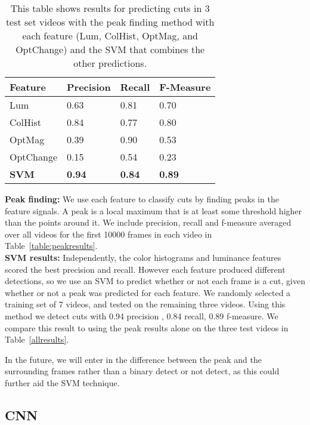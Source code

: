 \begin{table}[h!]
  \begin{center}
  	\small{
	\begin{tabular}{l|lll}
	Feature   & Precision  & Recall     & F-Measure  \\ \hline
	Lum       & 0.63      & 0.81   & 0.70      \\
	ColHist   & 0.84      & 0.77   & 0.80      \\
	OptMag    & 0.39      & 0.90   & 0.53      \\
	OptChange & 0.15      & 0.54   & 0.23      \\
	\textbf{SVM} & \textbf{0.94} & \textbf{0.84} & \textbf{0.89}\\ \hline
	\end{tabular}
	}
  \end{center}
  \label{table:allresults}
  \caption{This table shows results for predicting cuts in 3 test set videos with the peak finding method with each feature (Lum, ColHist, OptMag, and OptChange) and the SVM that combines the other predictions.}
\end{table} 


\noindent \textbf{Peak finding:} We use each feature to classify cuts by finding peaks in the feature signals. A peak is a local maximum that is at least some threshold higher than the points around it. We include precision, recall and f-measure averaged over all videos for the first 10000 frames in each video in Table~\ref{table:peakresults}.\\

\noindent \textbf{SVM results:} Independently, the color histograms and luminance features scored the best precision and recall. However each feature produced different detections, so we use an SVM to predict whether or not each frame is a cut, given whether or not a peak was predicted for each feature. We randomly selected a training set of 7 videos, and tested on the remaining three videos. Using this method we detect cuts with 0.94 precision , 0.84 recall, 0.89 f-measure. We compare this result to using the peak results alone on the three test videos in Table~\ref{allresults}. 

In the future, we will enter in the difference between the peak and the surrounding frames rather than a binary detect or not detect, as this could further aid the SVM technique.

\subsection*{CNN}


